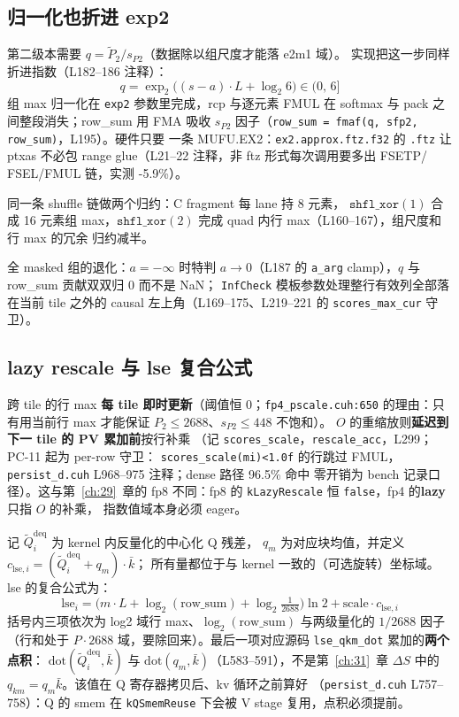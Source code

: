 \subsection{归一化也折进 exp2}

第二级本需要 $q=\tilde P_2/s_{P2}$（数据除以组尺度才能落 e2m1 域）。
实现把这一步同样折进指数（L182--186 注释）：
\begin{equation}
  q=\exp_2\!\bigl((s-a)\cdot L+\log_2 6\bigr)\in(0,\,6]
\end{equation}
组 max 归一化在 \texttt{exp2} 参数里完成，rcp 与逐元素
FMUL 在 softmax 与 pack 之间整段消失；row\_sum 用 FMA 吸收 $s_{P2}$
因子（\texttt{row\_sum = fmaf(q, sfp2, row\_sum)}，L195）。硬件只要
一条 MUFU.EX2：\texttt{ex2.approx.ftz.f32} 的 \texttt{.ftz} 让 ptxas
不必包 range glue（L21--22 注释，非 ftz 形式每次调用要多出 FSETP/
FSEL/FMUL 链，实测 -5.9\%）。

同一条 shuffle 链做两个归约：C fragment 每 lane 持 8 元素，
$\texttt{shfl\_xor}(1)$ 合成 16 元素组 max，$\texttt{shfl\_xor}(2)$
完成 quad 内行 max（L160--167），组尺度和行 max 的冗余
归约减半。

全 masked 组的退化：$a=-\infty$ 时特判 $a\to0$（L187 的
\texttt{a\_arg} clamp），$q$ 与 row\_sum 贡献双双归 0 而不是 NaN；
\texttt{InfCheck} 模板参数处理整行有效列全部落在当前 tile 之外的
causal 左上角（L169--175、L219--221 的 \texttt{scores\_max\_cur} 守卫）。

\subsection{lazy rescale 与 lse 复合公式}

跨 tile 的行 max \textbf{每 tile 即时更新}（阈值恒 0；\texttt{fp4\_pscale.cuh:650}
的理由：只有用当前行 max 才能保证 $P_2\le2688$、$s_{P2}\le448$ 不饱和）。
$O$ 的重缩放则\textbf{延迟到下一 tile 的 PV 累加前}按行补乘
（记 \texttt{scores\_scale}，\texttt{rescale\_acc}，L299；PC-11 起为 per-row 守卫：
\texttt{scores\_scale(mi)<1.0f} 的行跳过 FMUL，
\texttt{persist\_d.cuh} L968--975 注释；dense 路径 96.5\% 命中
零开销为 bench 记录口径）。这与第~\ref{ch:29}~章的 fp8 不同：fp8 的
\texttt{kLazyRescale} 恒 \texttt{false}，fp4 的\textbf{lazy}只指 $O$ 的补乘，
指数值域本身必须 eager。

记 $\widetilde Q_i^{\mathrm{deq}}$ 为 kernel 内反量化的中心化 Q 残差，
$q_m$ 为对应块均值，并定义
$c_{\mathrm{lse},i}=(\widetilde Q_i^{\mathrm{deq}}+q_m)\cdot\bar k$；
所有量都位于与 kernel 一致的（可选旋转）坐标域。lse 的复合公式为：
\begin{equation}
  \mathrm{lse}_i=\bigl(m\cdot L+\log_2(\mathrm{row\_sum})+
  \log_2\tfrac{1}{2688}\bigr)\ln 2+\mathrm{scale}\cdot c_{\mathrm{lse},i}
  \label{eq:32-lse}
\end{equation}
括号内三项依次为 log2 域行 max、$\log_2(\mathrm{row\_sum})$ 与两级量化的
$1/2688$ 因子（行和处于 $P\cdot2688$ 域，要除回来）。最后一项对应源码
\texttt{lse\_qkm\_dot} 累加的\textbf{两个点积}：
$\mathrm{dot}(\widetilde Q_i^{\mathrm{deq}},\bar k)$ 与
$\mathrm{dot}(q_m,\bar k)$（L583--591），不是第~\ref{ch:31}~章
$\Delta S$ 中的 $q_{km}=q_m\bar k$。该值在 Q 寄存器拷贝后、kv 循环之前算好
（\texttt{persist\_d.cuh} L757--758）：Q 的 smem 在 \texttt{kQSmemReuse}
下会被 V stage 复用，点积必须提前。

